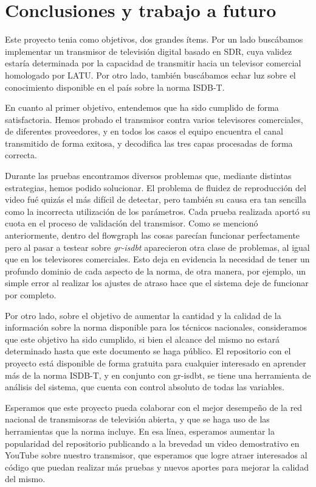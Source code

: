 \chapter{Conclusiones y trabajo a futuro}

Este proyecto tenia como objetivos, dos grandes ítems. Por un lado buscábamos implementar un transmisor de televisión digital basado en SDR, cuya validez estaría determinada por la capacidad de transmitir hacia un televisor comercial homologado por LATU. Por otro lado, también buscábamos echar luz sobre el conocimiento disponible en el país sobre la norma ISDB-T. 

En cuanto al primer objetivo, entendemos que ha sido cumplido de forma satisfactoria. Hemos probado el transmisor contra varios televisores comerciales, de diferentes proveedores, y en todos los casos el equipo encuentra el canal transmitido de forma exitosa, y decodifica las tres capas procesadas de forma correcta. 

Durante las pruebas encontramos diversos problemas que, mediante distintas estrategias, hemos podido solucionar. El problema de fluidez de reproducción del video fué quizás el más difícil de detectar, pero también su causa era tan sencilla como la incorrecta utilización de los parámetros. Cada prueba realizada aportó su cuota en el proceso de validación del transmisor. Como se mencionó anteriormente, dentro del flowgraph las cosas parecían funcionar perfectamente pero al pasar a testear sobre \textit{gr-isdbt} aparecieron otra clase de problemas, al igual que en los televisores comerciales. Esto deja en evidencia la necesidad de tener un profundo dominio de cada aspecto de la norma, de otra manera, por ejemplo, un simple error al realizar los ajustes de atraso hace que el sistema deje de funcionar por completo.

Por otro lado, sobre el objetivo de aumentar la cantidad y la calidad de la información sobre la norma disponible para los técnicos nacionales, consideramos que este objetivo ha sido cumplido, si bien el alcance del mismo no estará determinado hasta que este documento se haga público. El repositorio con el proyecto está disponible de forma gratuita para cualquier interesado en aprender más de la norma ISDB-T, y en conjunto con gr-isdbt, se tiene una herramienta de análisis del sistema, que cuenta con control absoluto de todas las variables. 

Esperamos que este proyecto pueda colaborar con el mejor desempeño de la red nacional de transmisoras de televisión abierta, y que se haga uso de las herramientas que la norma incluye. En esa línea, esperamos aumentar la popularidad del repositorio publicando a la brevedad un video demostrativo en YouTube sobre nuestro transmisor, que esperamos que logre atraer interesados al código que puedan realizar más pruebas y nuevos aportes para mejorar la calidad del mismo.

